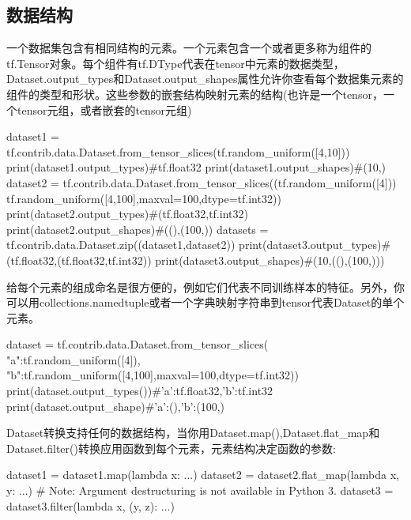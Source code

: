 \subsection{数据结构}
一个数据集包含有相同结构的元素。一个元素包含一个或者更多称为组件的tf.Tensor对象。每个组件有tf.DType代表在tensor中元素的数据类型，Dataset.output\_types和Dataset.output\_shapes属性允许你查看每个数据集元素的组件的类型和形状。这些参数的嵌套结构映射元素的结构(也许是一个tensor，一个tensor元组，或者嵌套的tensor元组)
\begin{python}
dataset1 = tf.contrib.data.Dataset.from_tensor_slices(tf.random_uniform([4,10]))
print(dataset1.output_types)#tf.float32
print(dataset1.output_shapes)#(10,)
dataset2 = tf.contrib.data.Dataset.from_tensor_slices((tf.random_uniform([4]))
tf.random_uniform([4,100],maxval=100,dtype=tf.int32))
print(dataset2.output_types)#(tf.float32,tf.int32)
print(dataset2.output_shapes)#((),(100,))
datasets = tf.contrib.data.Dataset.zip((dataset1,dataset2))
print(dataset3.output_types)#(tf.float32,(tf.float32,tf.int32))
print(dataset3.output_shapes)#(10,((),(100,)))
\end{python}
给每个元素的组成命名是很方便的，例如它们代表不同训练样本的特征。另外，你可以用collections.namedtuple或者一个字典映射字符串到tensor代表Dataset的单个元素。
\begin{python}
dataset = tf.contrib.data.Dataset.from_tensor_slices({
	"a":tf.random_uniform([4]),
	"b":tf.random_uniform([4,100],maxval=100,dtype=tf.int32}))
print(dataset.output_types())#{'a':tf.float32,'b':tf.int32}
print(dataset.output_shape)#{'a':(),'b':(100,)}
\end{python}
Dataset转换支持任何的数据结构，当你用Dataset.map(),Dataset.flat\_map和Dataset.filter()转换应用函数到每个元素，元素结构决定函数的参数:
\begin{python}
dataset1 = dataset1.map(lambda x: ...)
dataset2 = dataset2.flat_map(lambda x, y: ...)
# Note: Argument destructuring is not available in Python 3.
dataset3 = dataset3.filter(lambda x, (y, z): ...)
\end{python}
